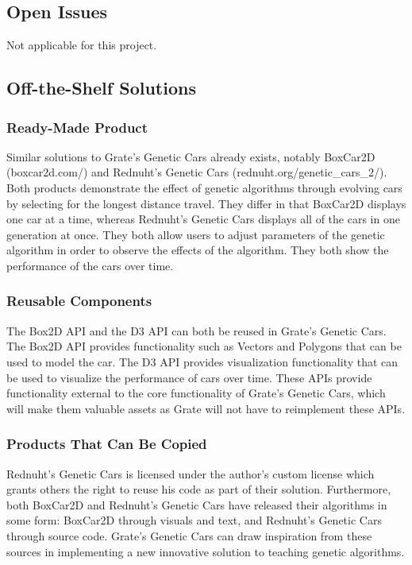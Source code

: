 \documentclass[12pt, titlepage]{article}
\begin{document}
\subsection{Open Issues}
Not applicable for this project.

\subsection{Off-the-Shelf Solutions}

\subsubsection{Ready-Made Product}
Similar solutions to Grate's Genetic Cars already exists, notably BoxCar2D 
(boxcar2d.com/) and Rednuht's Genetic Cars (rednuht.org/genetic\_cars\_2/). Both 
products demonstrate the effect of genetic algorithms through evolving cars by 
selecting for the longest distance travel. They differ in that BoxCar2D displays 
one car at a time, whereas Rednuht's Genetic Cars displays all of the cars in 
one generation at once. They both allow users to adjust parameters of the 
genetic algorithm in order to observe the effects of the algorithm. They both 
show the performance of the cars over time.

\subsubsection{Reusable Components}
The Box2D API and the D3 API can both be reused in Grate's Genetic Cars. The 
Box2D API provides functionality such as Vectors and Polygons that can be used 
to model the car. The D3 API provides visualization functionality that can be 
used to visualize the performance of cars over time. These APIs provide 
functionality external to the core functionality of Grate's Genetic Cars, which 
will make them valuable assets as Grate will not have to reimplement these APIs.

\subsubsection{Products That Can Be Copied}
Rednuht's Genetic Cars is licensed under the author's custom license which 
grants others the right to reuse his code as part of their solution. 
Furthermore, both BoxCar2D and Rednuht's Genetic Cars have released their 
algorithms in some form: BoxCar2D through visuals and text, and Rednuht's 
Genetic Cars through source code. Grate's Genetic Cars can draw inspiration from 
these sources in implementing a new innovative solution to teaching genetic 
algorithms.
\end{document}
